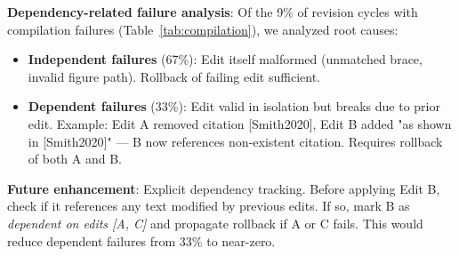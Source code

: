 \textbf{Dependency-related failure analysis}: Of the 9\% of revision cycles with compilation failures (Table~\ref{tab:compilation}), we analyzed root causes:
\begin{itemize}
\item \textbf{Independent failures} (67\%): Edit itself malformed (unmatched brace, invalid figure path). Rollback of failing edit sufficient.
\item \textbf{Dependent failures} (33\%): Edit valid in isolation but breaks due to prior edit. Example: Edit A removed citation [Smith2020], Edit B added "as shown in [Smith2020]" — B now references non-existent citation. Requires rollback of both A and B.
\end{itemize}

\textbf{Future enhancement}: Explicit dependency tracking. Before applying Edit B, check if it references any text modified by previous edits. If so, mark B as \textit{dependent on edits [A, C]} and propagate rollback if A or C fails. This would reduce dependent failures from 33\% to near-zero.